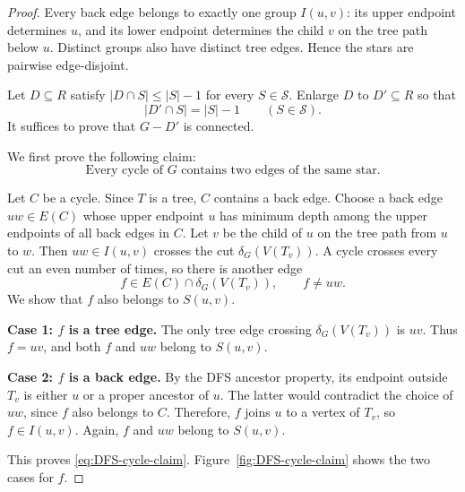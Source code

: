 \documentclass[11pt]{amsart}
\newcommand{\1}{\mathbbm{1}}
\begin{document}
\begin{proof}
Every back edge belongs to exactly one group $I(u,v)$: its upper
endpoint determines $u$, and its lower endpoint determines the
child $v$ on the tree path below $u$. Distinct groups also have
distinct tree edges. Hence the stars are pairwise edge-disjoint.

Let $D\subseteq R$ satisfy $|D\cap S|\le |S|-1$ for every
$S\in\mathcal{S}$. Enlarge $D$ to $D'\subseteq R$ so that
\[
    |D'\cap S|=|S|-1
    \qquad(S\in\mathcal{S}).
\]
It suffices to prove that $G-D'$ is connected.

We first prove the following claim:
\begin{equation}
\label{eq:DFS-cycle-claim}
    \text{Every cycle of $G$ contains two edges of the same star.}
\end{equation}

Let $C$ be a cycle. Since $T$ is a tree, $C$ contains a
back edge. Choose a back edge $uw\in E(C)$ whose upper endpoint
$u$ has minimum depth among the upper endpoints of all back edges
in $C$. Let $v$ be the child of $u$ on the tree path from $u$ to $w$.
Then $uw\in I(u,v)$ crosses the cut $\delta_G(V(T_v))$.
A cycle crosses every cut an even number of times, so there is
another edge
\[
    f\in E(C)\cap\delta_G(V(T_v)),
    \qquad f\ne uw.
\]
We show that $f$ also belongs to $S(u,v)$.

\smallskip\noindent
\textbf{Case 1: $f$ is a tree edge.}
The only tree edge crossing $\delta_G(V(T_v))$ is $uv$.
Thus $f=uv$, and both $f$ and $uw$ belong to $S(u,v)$.

\smallskip\noindent
\textbf{Case 2: $f$ is a back edge.}
By the DFS ancestor property, its endpoint outside $T_v$ is
either $u$ or a proper ancestor of $u$. The latter would
contradict the choice of $uw$, since $f$ also belongs to $C$.
Therefore, $f$ joins $u$ to a vertex of $T_v$, so
$f\in I(u,v)$. Again, $f$ and $uw$ belong to $S(u,v)$.

This proves \eqref{eq:DFS-cycle-claim}.
Figure~\ref{fig:DFS-cycle-claim} shows the two cases for $f$.


\end{proof}
\end{document}
